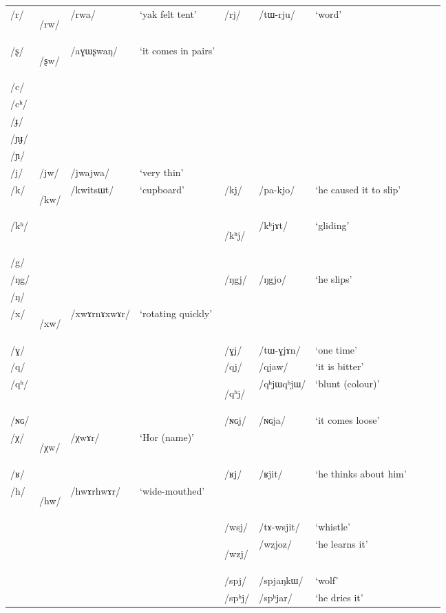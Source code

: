 \documentclass[12pt]{article}
\newcommand{\ipa}[1]{\mbox{\phon/#1/}}
\newcommand{\deux}[1]{\ipa{#1}\addtocounter{2clusters}{1}}
\newcommand{\trois}[1]{\ipa{#1}\addtocounter{3clusters}{1}}
\newcommand{\tib}[1]{\cellcolor{lightgray}\textbf{#1}}
\newcommand{\idph}[1]{\cellcolor{gray}\textbf{#1}}
\begin{document}
\begin{landscape}
\begin{longtable}{llllllllll}
\ipa{r} &\deux{rw}\tib{} &\ipa{rwa} & `yak felt tent' &\deux{rj} &\ipa{tɯ-rju} & `word' \\ 
\ipa{ʂ} &\deux{ʂw} \tib{} &\ipa{aɣɯʂwaŋ} & `it comes in pairs' & & &\\ 
\ipa{c} & & & & & &\\ 
\ipa{cʰ} & & & & & &\\ 
\ipa{ɟ} & & & & & &\\ 
\ipa{ɲɟ} & & & & & &\\ 
\ipa{ɲ} & & & & & &\\ 
\ipa{j} &\deux{jw} &\ipa{jwajwa} & `very thin' & & &\\ 
\ipa{k} &\deux{kw}\tib{} &\ipa{kwitsɯt} & `cupboard' &\deux{kj} &\ipa{pa-kjo} & `he caused it to slip' \\ 
\ipa{kʰ} & & & & \deux{kʰj} \idph{}& \ipa{kʰjɤt} & `gliding' \\ 
\ipa{g} & & & & & &\\ 
\ipa{ŋg} & & & &\deux{ŋgj} &\ipa{ŋgjo} & `he slips' \\ 
\ipa{ŋ} & & & & & &\\ 
\ipa{x} &\deux{xw}\idph{} & \ipa{xwɤrnɤxwɤr}& `rotating quickly' & & &\\ 
\ipa{ɣ} & & & &\deux{ɣj} &\ipa{tɯ-ɣjɤn} & `one time' \\ 
\ipa{q} & & & &\deux{qj} &\ipa{qjaw} & `it is bitter' \\ 
\ipa{qʰ} & & & &\deux{qʰj} \idph{} &\ipa{qʰjɯqʰjɯ} & `blunt (colour)' \\ 
\ipa{ɴɢ} & & & &\deux{ɴɢj} &\ipa{ɴɢja} & `it comes loose' \\ 
\ipa{χ} &\deux{χw} \tib{} &\ipa{χwɤr} & `Hor (name)' & & &\\ 
\ipa{ʁ} & & & &\deux{ʁj} &\ipa{ʁjit} & `he thinks about him' \\
\ipa{h} &\deux{hw} \idph{} &\ipa{hwɤrhwɤr} & `wide-mouthed' & & &\\ 
\midrule
 & & & &\trois{wsj} &\ipa{tɤ-wsjit} & `whistle' \\
 & & & &\trois{wzj}  \tib{} &\ipa{wzjoz} & `he learns it' \\            
 & & & &\trois{spj} &\ipa{spjaŋkɯ} & `wolf' \\
 & & & &\trois{spʰj} &\ipa{spʰjar} & `he dries it' \\

\end{longtable}
\end{landscape}
\end{document}
